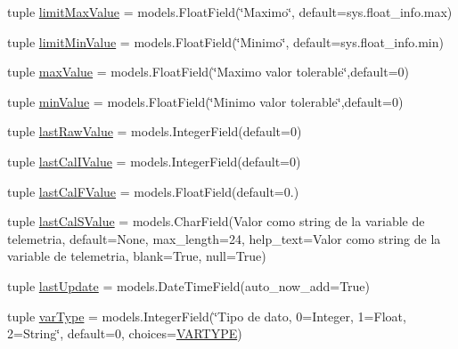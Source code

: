 \begin{DoxyCompactItemize}
\item 
tuple \hyperlink{class_ground_segment_1_1models_1_1_tlmy_var_type_1_1_tlmy_var_type_ab42a42f83be3f8cd6ac9a539d8bf20d5}{limit\+Max\+Value} = models.\+Float\+Field(\char`\"{}Maximo\char`\"{}, default=sys.\+float\+\_\+info.\+max)
\item 
tuple \hyperlink{class_ground_segment_1_1models_1_1_tlmy_var_type_1_1_tlmy_var_type_a6a72ffd8c8ee632719af8e431e0c4cda}{limit\+Min\+Value} = models.\+Float\+Field(\char`\"{}Minimo\char`\"{}, default=sys.\+float\+\_\+info.\+min)
\item 
tuple \hyperlink{class_ground_segment_1_1models_1_1_tlmy_var_type_1_1_tlmy_var_type_a3fe5c6c331f85af0dbe2a9c7dee3f9ca}{max\+Value} = models.\+Float\+Field(\char`\"{}Maximo valor tolerable\char`\"{},default=0)
\item 
tuple \hyperlink{class_ground_segment_1_1models_1_1_tlmy_var_type_1_1_tlmy_var_type_a8964b78ce3862227c1cbe58c2782a48a}{min\+Value} = models.\+Float\+Field(\char`\"{}Minimo valor tolerable\char`\"{},default=0)
\item 
tuple \hyperlink{class_ground_segment_1_1models_1_1_tlmy_var_type_1_1_tlmy_var_type_a224d87e5ebbf0736a428fbde2276db10}{last\+Raw\+Value} = models.\+Integer\+Field(default=0)
\item 
tuple \hyperlink{class_ground_segment_1_1models_1_1_tlmy_var_type_1_1_tlmy_var_type_adb9ebf5cf2eb31fe549eadae8b7f1615}{last\+Cal\+I\+Value} = models.\+Integer\+Field(default=0)
\item 
tuple \hyperlink{class_ground_segment_1_1models_1_1_tlmy_var_type_1_1_tlmy_var_type_aeec9d897714cc3dee96dbbc0559489f9}{last\+Cal\+F\+Value} = models.\+Float\+Field(default=0.)
\item 
tuple \hyperlink{class_ground_segment_1_1models_1_1_tlmy_var_type_1_1_tlmy_var_type_a29c38267c43d1309cef9066ac601d1e0}{last\+Cal\+S\+Value} = models.\+Char\+Field(\textquotesingle{}Valor como string de la variable de telemetria\textquotesingle{}, default=None, max\+\_\+length=24, help\+\_\+text=\textquotesingle{}Valor como string de la variable de telemetria\textquotesingle{}, blank=True, null=True)
\item 
tuple \hyperlink{class_ground_segment_1_1models_1_1_tlmy_var_type_1_1_tlmy_var_type_a06466ba7facb3a70086ebbee4c25fddd}{last\+Update} = models.\+Date\+Time\+Field(auto\+\_\+now\+\_\+add=True)
\item 
tuple \hyperlink{class_ground_segment_1_1models_1_1_tlmy_var_type_1_1_tlmy_var_type_a35be15cacdc2b07e3e0ef9a5962ef57a}{var\+Type} = models.\+Integer\+Field(\char`\"{}Tipo de dato, 0=Integer, 1=Float, 2=String\char`\"{}, default=0, choices=\hyperlink{class_ground_segment_1_1models_1_1_tlmy_var_type_1_1_tlmy_var_type_a9a9b6dcda859afbf512855888fd787fa}{V\+A\+R\+T\+Y\+P\+E})

\end{DoxyCompactItemize}
